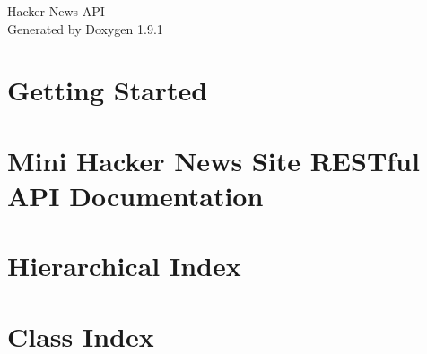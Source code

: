 \let\mypdfximage\pdfximage\def\pdfximage{\immediate\mypdfximage}\documentclass[twoside]{book}
\newcommand{\+}{\discretionary{\mbox{\scriptsize$\hookleftarrow$}}{}{}}
\newcommand{\clearemptydoublepage}{%
  \newpage{\pagestyle{empty}\cleardoublepage}%
}
\begin{document}
\raggedbottom

\hypersetup{pageanchor=false,
             bookmarksnumbered=true,
             pdfencoding=unicode
            }
\begin{titlepage}
\vspace*{7cm}
\begin{center}%
{\Large Hacker News API }\\
\vspace*{1cm}
{\large Generated by Doxygen 1.9.1}\\
\end{center}
\end{titlepage}
\clearemptydoublepage
{}
\tableofcontents
\clearemptydoublepage
{}
\hypersetup{pageanchor=true}

\chapter{Getting Started}
\label{md_HELP}

\chapter{Mini Hacker News Site RESTful API Documentation}
\label{md_README}

\chapter{Hierarchical Index}

\chapter{Class Index}

\end{document}

